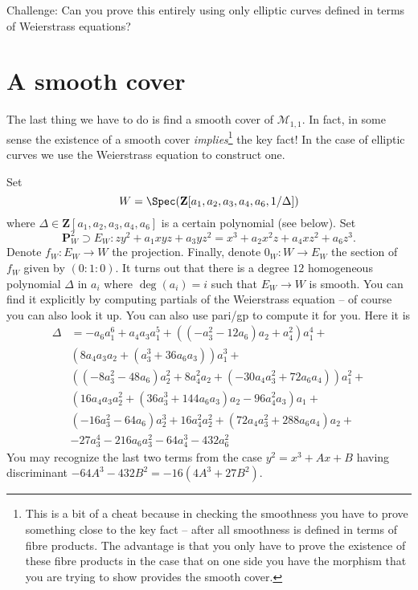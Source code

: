 \medskip\noindent
Challenge: Can you prove this entirely using only elliptic curves
defined in terms of Weierstrass equations?




\section{A smooth cover}
\label{section-smooth}

\noindent
The last thing we have to do is find a smooth cover of $\mathcal{M}_{1, 1}$.
In fact, in some sense the existence of a smooth cover
{\it implies}\footnote{This is a bit of a cheat because
in checking the smoothness you have to prove something close to
the key fact -- after all smoothness is defined in terms of
fibre products. The advantage is that you only have to prove the existence
of these fibre products in the case that on one side you have the morphism
that you are trying to show provides the smooth cover.} the key fact!
In the case of elliptic curves we use the Weierstrass equation to
construct one.

\medskip\noindent
Set
$$
W = \Spec(\mathbf{Z}[a_1, a_2, a_3, a_4, a_6, 1/\Delta])
$$
where $\Delta \in \mathbf{Z}[a_1, a_2, a_3, a_4, a_6]$ is a certain
polynomial (see below). Set
$$
\mathbf{P}_W^2 \supset E_W :
zy^2 + a_1 xyz + a_3 yz^2 = x^3 + a_2x^2z + a_4xz^2 + a_6z^3.
$$
Denote $f_W : E_W \to W$ the projection. Finally, denote $0_W : W \to E_W$
the section of $f_W$ given by $(0 : 1 : 0)$. It turns out that
there is a degree $12$ homogeneous polynomial $\Delta$ in $a_i$
where $\deg(a_i) = i$ such that $E_W \to W$ is smooth.
You can find it explicitly by computing partials of the
Weierstrass equation -- of course you can also look it up. You can
also use pari/gp to compute it for you. Here it is
\begin{align*}
\Delta & = -a_6a_1^6 + a_4a_3a_1^5 + ((-a_3^2 - 12a_6)a_2 + a_4^2)a_1^4 + \\
& (8a_4a_3a_2 + (a_3^3 + 36a_6a_3))a_1^3 + \\
& ((-8a_3^2 - 48a_6)a_2^2 + 8a_4^2a_2 + (-30a_4a_3^2 + 72a_6a_4))a_1^2 + \\
& (16a_4a_3a_2^2 + (36a_3^3 + 144a_6a_3)a_2 - 96a_4^2a_3)a_1 + \\
& (-16a_3^2 - 64a_6)a_2^3 + 16a_4^2a_2^2 + (72a_4a_3^2 + 288a_6a_4)a_2 + \\
& -27a_3^4 - 216a_6a_3^2  -64a_4^3 - 432a_6^2
\end{align*}
You may recognize the last two terms from the case
$y^2 = x^3 + Ax + B$ having discriminant $-64A^3 - 432B^2 = -16(4A^3 + 27B^2)$.

